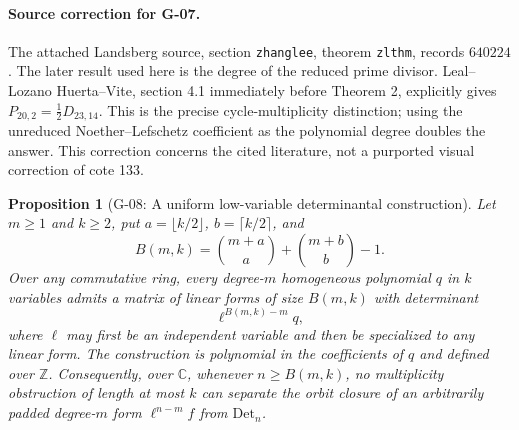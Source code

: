 \documentclass[11pt,a4paper]{article}
\newtheorem{proposition}{Proposition}
\theoremstyle{definition}\newtheorem{definition}{Definition}
\begin{document}
\paragraph{Source correction for G-07.}
The attached Landsberg source, section \nolinkurl{zhanglee}, theorem \nolinkurl{zlthm}, records $640224$. The later result used here is the degree of the reduced prime divisor. Leal--Lozano Huerta--Vite, section 4.1 immediately before Theorem 2, explicitly gives $P_{20,2}=\tfrac12D_{23,14}$. This is the precise cycle-multiplicity distinction; using the unreduced Noether--Lefschetz coefficient as the polynomial degree doubles the answer. This correction concerns the cited literature, not a purported visual correction of cote 133.

\begin{proposition}[G-08: A uniform low-variable determinantal construction]\label{G-08}
Let $m\geq1$ and $k\geq2$, put $a=\lfloor k/2\rfloor$, $b=\lceil k/2\rceil$, and
\[
 B(m,k)=\binom{m+a}{a}+\binom{m+b}{b}-1.
\]
Over any commutative ring, every degree-$m$ homogeneous polynomial $q$ in $k$ variables admits a matrix of linear forms of size $B(m,k)$ with determinant
\[
 \ell^{B(m,k)-m}q,
\]
where $\ell$ may first be an independent variable and then be specialized to any linear form. The construction is polynomial in the coefficients of $q$ and defined over $\mathbb Z$.
Consequently, over $\mathbb C$, whenever $n\geq B(m,k)$, no multiplicity obstruction of length at most $k$ can separate the orbit closure of an arbitrarily padded degree-$m$ form $\ell^{n-m}f$ from $\mathrm{Det}_n$.
\end{proposition}
\end{document}
